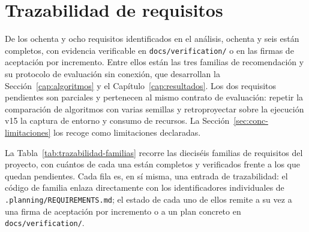 \section{Trazabilidad de requisitos}\label{sec:req-trazabilidad}

De los ochenta y ocho requisitos identificados en el análisis, ochenta y seis están
completos, con evidencia verificable en \texttt{docs/verification/} o en las firmas de
aceptación por incremento. Entre ellos están las tres familias de recomendación y su protocolo de evaluación
sin conexión, que desarrollan la Sección~\ref{cap:algoritmos} y el Capítulo~\ref{cap:resultados}.
Los dos requisitos pendientes son parciales y pertenecen al mismo contrato de evaluación:
repetir la comparación de algoritmos con varias semillas y retroproyectar sobre la ejecución
v15 la captura de entorno y consumo de recursos. La Sección~\ref{sec:conc-limitaciones} los
recoge como limitaciones declaradas.

La Tabla~\ref{tab:trazabilidad-familias} recorre las dieciséis familias de requisitos del
proyecto, con cuántos de cada una están completos y verificados frente a los que quedan
pendientes. Cada fila es, en sí misma, una entrada de trazabilidad: el código de familia enlaza
directamente con los identificadores individuales de \texttt{.planning/REQUIREMENTS.md}; el
estado de cada uno de ellos remite a su vez a una firma de aceptación por incremento o a un plan
concreto en \texttt{docs/verification/}.

